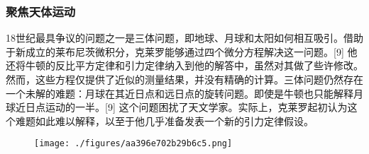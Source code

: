 \subsubsection{聚焦天体运动}  
18世纪最具争议的问题之一是三体问题，即地球、月球和太阳如何相互吸引。借助于新成立的莱布尼茨微积分，克莱罗能够通过四个微分方程解决这一问题。[9] 他还将牛顿的反比平方定律和引力定律纳入到他的解答中，虽然对其做了些许修改。然而，这些方程仅提供了近似的测量结果，并没有精确的计算。三体问题仍然存在一个未解的难题：月球在其近日点和远日点的旋转问题。即使是牛顿也只能解释月球近日点运动的一半。[9] 这个问题困扰了天文学家。实际上，克莱罗起初认为这个难题如此难以解释，以至于他几乎准备发表一个新的引力定律假设。
\begin{figure}[ht]
\centering
\texttt{[image: ./figures/aa396e702b29b6c5.png]}
\caption{} \label{fig_Alexis_3}
\end{figure}